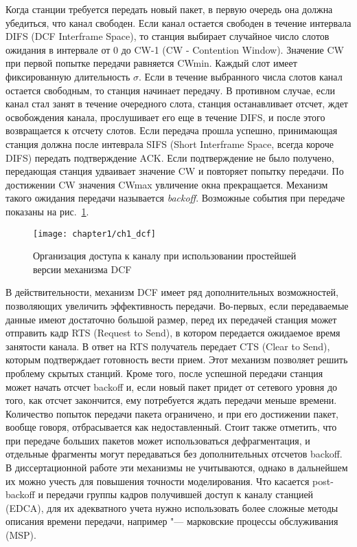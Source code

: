 Когда станции требуется передать новый пакет, в первую очередь она должна убедиться, что канал свободен. Если канал остается свободен в течение интервала DIFS (DCF Interframe Space), то станция выбирает случайное число слотов ожидания в интервале от 0 до CW-1 (CW - Contention Window). Значение CW при первой попытке передачи равняется CWmin. Каждый слот имеет фиксированную длительность $\sigma$. Если в течение выбранного числа слотов канал остается свободным, то станция начинает передачу. В противном случае, если канал стал занят в течение очередного слота, станция останавливает отсчет, ждет освобождения канала, прослушивает его еще в течение DIFS, и после этого возвращается к отсчету слотов. Если передача прошла успешно, принимающая станция должна после интеврала SIFS (Short Interframe Space, всегда короче DIFS) передать подтверждение ACK. Если подтверждение не было получено, передающая станция удваивает значение CW и повторяет попытку передачи. По достижении CW значения CWmax увличение окна прекращается. Механизм такого ожидания передачи называется \textit{backoff}. Возможные события при передаче показаны на рис.~\ref{fig:ch1_dcf}.

\begin{figure}[h!]
   \centering
    \texttt{[image: chapter1/ch1\_dcf]}
	\caption{Организация доступа к каналу при использовании простейшей версии механизма DCF}
	\label{fig:ch1_dcf}
\end{figure}

В действительности, механизм DCF имеет ряд дополнительных возможностей, позволяющих увеличить эффективность передачи. Во-первых, если передаваемые данные имеют достаточно большой размер, перед их передачей станция может отправить кадр RTS (Request to Send), в котором передается ожидаемое время занятости канала. В ответ на RTS получатель передает CTS (Clear to Send), которым подтверждает готовность вести прием. Этот механизм позволяет решить проблему скрытых станций. Кроме того, после успешной передачи станция может начать отсчет backoff и, если новый пакет придет от сетевого уровня до того, как отсчет закончится, ему потребуется ждать передачи меньше времени. Количество попыток передачи пакета ограничено, и при его достижении пакет, вообще говоря, отбрасывается как недоставленный. Стоит также отметить, что при передаче больших пакетов может использоваться дефрагментация, и отдельные фрагменты могут передаваться без дополнительных отсчетов backoff. В диссертационной работе эти механизмы не учитываются, однако в дальнейшем их можно учесть для повышения точности моделирования. Что касается post-backoff и передачи группы кадров получившей доступ к каналу станцией (EDCA), для их адекватного учета нужно использовать более сложные методы описания времени передачи, например "--- марковские процессы обслуживания (MSP).


